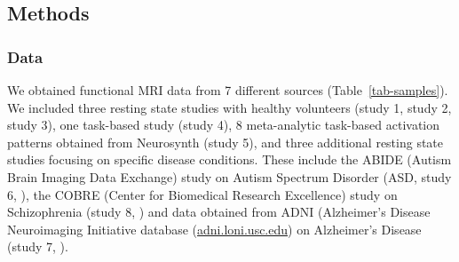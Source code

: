 \documentclass{article}
\begin{document}
\subsection{Methods}\label{Methods}

\subsubsection{Data}\label{Data}

We obtained functional MRI data from 7 different sources (Table~\ref{tab-samples}).
We included three resting state studies with healthy volunteers (study 1, study 2, study 3), one task-based study (study 4), 8 meta-analytic task-based activation patterns obtained from Neurosynth (study 5), and three additional resting state studies focusing on specific disease conditions. These include the ABIDE (Autism Brain Imaging Data Exchange) study on Autism Spectrum Disorder (ASD, study 6, \cite{di2014autism}), the COBRE (Center for Biomedical Research Excellence) study on Schizophrenia (study 8, \citep{aine2017multimodal}) and data obtained from ADNI (Alzheimer's Disease Neuroimaging Initiative database (\href{http://adni.loni.usc.edu}{adni.loni.usc.edu}) on Alzheimer's Disease (study 7, \citep{petersen2010alzheimer}).
\end{document}
